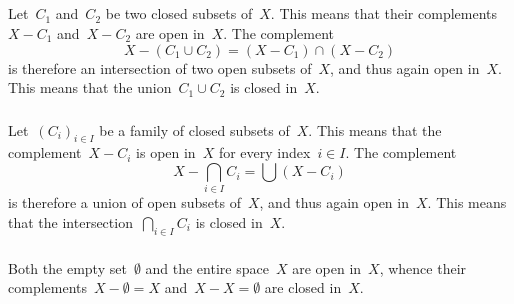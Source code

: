 \subsection{}



\subsubsection{}

Let~$C_1$ and~$C_2$ be two closed subsets of~$X$.
This means that their complements~$X - C_1$ and~$X - C_2$ are open in~$X$.
The complement
\[
	X - (C_1 ∪ C_2)
	=
	(X - C_1) ∩ (X - C_2)
\]
is therefore an intersection of two open subsets of~$X$, and thus again open in~$X$.
This means that the union~$C_1 ∪ C_2$ is closed in~$X$.



\subsubsection{}

Let~$(C_i)_{i ∈ I}$ be a family of closed subsets of~$X$.
This means that the complement~$X - C_i$ is open in~$X$ for every index~$i ∈ I$.
The complement
\[
	X - ⋂_{i ∈ I} C_i
	=
	⋃{} (X - C_i)
\]
is therefore a union of open subsets of~$X$, and thus again open in~$X$.
This means that the intersection~$⋂_{i ∈ I} C_i$ is closed in~$X$.



\subsubsection{}

Both the empty set~$∅$ and the entire space~$X$ are open in~$X$, whence their complements~$X - ∅ = X$ and~$X - X = ∅$ are closed in~$X$.
